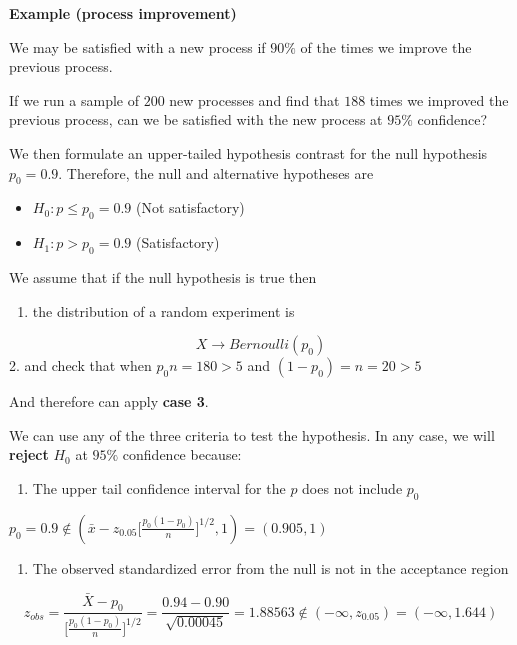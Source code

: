 \documentclass[
]{book}
\providecommand{\tightlist}{%
  \setlength{\itemsep}{0pt}\setlength{\parskip}{0pt}}
\begin{document}
\textbf{Example (process improvement)}

We may be satisfied with a new process if \(90\%\) of the times we improve the previous process.

If we run a sample of \(200\) new processes and find that \(188\) times we improved the previous process, can we be satisfied with the new process at \(95\%\) confidence?

We then formulate an upper-tailed hypothesis contrast for the null hypothesis \(p_0=0.9\). Therefore, the null and alternative hypotheses are

\begin{itemize}
\tightlist
\item
  \(H_0: p \leq p_0=0.9\) (Not satisfactory)
\item
  \(H_1: p> p_0=0.9\) (Satisfactory)
\end{itemize}

We assume that if the null hypothesis is true then

\begin{enumerate}
\def\labelenumi{\arabic{enumi}.}
\tightlist
\item
  the distribution of a random experiment is
\end{enumerate}

\[X \rightarrow Bernoulli (p_0)\]
2. and check that when \(p_0n=180>5\) and \((1-p_0)=n=20>5\)

And therefore can apply \textbf{case 3}.

We can use any of the three criteria to test the hypothesis. In any case, we will \textbf{reject} \(H_0\) at \(95\%\) confidence because:

\begin{enumerate}
\def\labelenumi{\arabic{enumi}.}
\tightlist
\item
  The upper tail confidence interval for the \(p\) does not include \(p_0\)
\end{enumerate}

\(p_0=0.9 \notin (\bar{x}-z_{0.05}\big[\frac{p_0(1-p_0)}{n} \big]^{1/2},1)= (0.905,1)\)

\begin{enumerate}
\def\labelenumi{\arabic{enumi}.}
\setcounter{enumi}{1}
\tightlist
\item
  The observed standardized error from the null is not in the acceptance region
\end{enumerate}

\[z_{obs}= \frac{\bar{X}-p_0}{\big[\frac{p_0(1-p_0)}{n} \big]^{1/2}} =\frac{0.94-0.90}{\sqrt{0.00045}}=1.88563 \notin (-\infty, z_{0.05})=(-\infty, 1.644)\]
\end{document}
